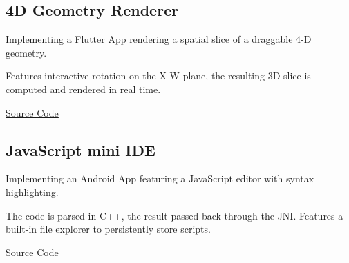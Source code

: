 \documentclass{article}
\begin{document}
\begin{paracol}{2}
\subsection{4D Geometry Renderer}
Implementing a Flutter App rendering a spatial slice of a draggable 4-D geometry.

Features interactive rotation on the X-W plane, the resulting 3D slice is computed and rendered in real time.

\href{https://github.com/jim-ec/pentachoron}{\underline{Source Code}}

\subsection{JavaScript mini IDE}
Implementing an Android App featuring a JavaScript editor with syntax highlighting.

The code is parsed in C++, the result passed back through the JNI. Features a built-in file explorer to persistently store scripts.

\href{https://github.com/jim-ec/javascript-mini-ide}{\underline{Source Code}}

\end{paracol}
\end{document}
